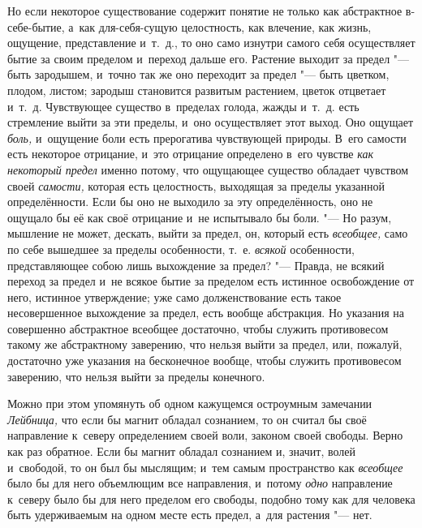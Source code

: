 Но если некоторое существование содержит понятие не только как абстрактное
в-себе-бытие, а~как для-себя-сущую целостность, как влечение, как жизнь,
ощущение, представление и~т.~д., то оно само изнутри самого себя
осуществляет бытие за своим пределом и~переход дальше его. Растение выходит
за предел "--- быть зародышем, и~точно так же оно переходит за предел "--- быть
цветком, плодом, листом; зародыш становится развитым растением, цветок
отцветает и~т.~д. Чувствующее существо в~пределах голода, жажды и~т.~д.
есть стремление выйти за эти пределы, и~оно осуществляет этот выход. Оно
ощущает {\em боль,} и~ощущение боли есть прерогатива
чувствующей природы. В~его самости есть некоторое отрицание, и~это
отрицание определено в~его чувстве {\em как некоторый
предел} именно потому, что ощущающее существо обладает чувством своей
{\em самости,} которая есть целостность, выходящая за
пределы указанной определённости. Если бы оно не выходило за эту
определённость, оно не ощущало бы её как своё отрицание и~не испытывало бы
боли. "--- Но разум, мышление не может, дескать, выйти за предел, он, который
есть {\em всеобщее,} само по себе вышедшее за пределы
особенности, т.~е. {\em всякой} особенности,
представляющее собою лишь выхождение за предел? "--- Правда, не всякий переход
за предел и~не всякое бытие за пределом есть истинное освобождение от него,
истинное утверждение; уже само долженствование есть такое несовершенное
выхождение за предел, есть вообще абстракция. Но указания на совершенно
абстрактное всеобщее достаточно, чтобы служить противовесом такому же
абстрактному заверению, что нельзя выйти за предел, или, пожалуй,
достаточно уже указания на бесконечное вообще, чтобы служить противовесом
заверению, что нельзя выйти за пределы конечного.

Можно при этом упомянуть об одном кажущемся остроумным замечании
{\em Лейбница,} что если бы магнит обладал сознанием,
то он считал бы своё направление к~северу определением своей воли, законом
своей свободы\label{magpage}. Верно как раз
обратное. Если бы магнит обладал сознанием и, значит, волей и~свободой, то
он был бы мыслящим; и~тем самым пространство как
{\em всеобщее} было бы для него объемлющим все
направления, и~потому {\em одно} направление к~северу
было бы для него пределом его свободы, подобно тому как для человека быть
удерживаемым на одном месте есть предел, а~для растения "--- нет.

